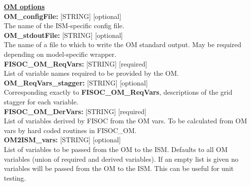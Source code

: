 \documentclass[11pt]{article}
\begin{document}
\begin{flushleft}
\vspace{16pt}

\textbf{\underline{OM options}} \\
\vspace{6pt}
\textbf{OM\_configFile:}      [STRING] [optional]                          \\
The name of the ISM-specific config file.                                  \\
\vspace{6pt}
\textbf{OM\_stdoutFile:}     [STRING] [optional]                           \\
The name of a file to which to write the OM standard output.  May be 
required depending on model-specific wrapper.                              \\
\vspace{6pt}
\textbf{FISOC\_OM\_ReqVars:}  [STRING] [required]                          \\
List of variable names required to be provided by the OM.                  \\
\vspace{6pt}
\textbf{OM\_ReqVars\_stagger:} [STRING] [optional]                         \\
Corresponding exactly to \textbf{FISOC\_OM\_ReqVars}, descriptions of the 
grid stagger for each variable.                                            \\
\vspace{6pt}
\textbf{FISOC\_OM\_DerVars:}  [STRING] [required]                          \\
List of variables derived by FISOC from the OM vars.  
To be calculated from OM vars by hard coded routines in FISOC\_OM.        \\
\vspace{6pt}
\textbf{OM2ISM\_vars:}        [STRING] [optional]                          \\
List of variables to be passed from the OM to the ISM. Defaults to 
all OM variables (union of required and derived variables). If an empty 
list is given no variables will be passed from the OM to the ISM.  This 
can be useful for unit testing.                                            \\ 

\end{flushleft}
\end{document}
